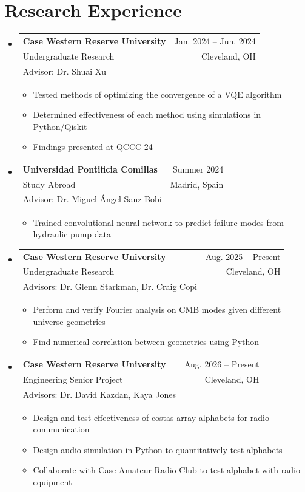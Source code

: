\documentclass[letterpaper,11pt]{article}
\makeatletter
\newcommand{\resumeItem}[1]{
  \item\small{
    {#1 \vspace{-2pt}}
  }
}
\newcommand{\resumeResearchSubheading}[5]{
  \item
    \begin{tabular*}{0.97\textwidth}[t]{l@{\extracolsep{\fill}}r}
      \textbf{#1} & #2 \\
      {#3} & {#4} \\
      \small #5 & \\
    \end{tabular*}\vspace{-7pt}
}
\newcommand{\resumeSubHeadingListStart}{\begin{itemize}[leftmargin=0.15in, label={}]}
\newcommand{\resumeSubHeadingListEnd}{\end{itemize}}
\newcommand{\resumeItemListStart}{\begin{itemize}}
\newcommand{\resumeItemListEnd}{\end{itemize}\vspace{-5pt}}
\makeatother
\begin{document}
\section{Research Experience}
  \resumeSubHeadingListStart
    \resumeResearchSubheading
      {Case Western Reserve University}{Jan. 2024 -- Jun. 2024}
      {Undergraduate Research}{Cleveland, OH}
      {Advisor: Dr. Shuai Xu}
      \resumeItemListStart
        \resumeItem{Tested methods of optimizing the convergence of a VQE algorithm}
        \resumeItem{Determined effectiveness of each method using simulations in Python/Qiskit}
        \resumeItem{Findings presented at QCCC-24}
      \resumeItemListEnd
    \resumeResearchSubheading
      {Universidad Pontificia Comillas}{Summer 2024}
      {Study Abroad}{Madrid, Spain}
      {Advisor: Dr. Miguel Ángel Sanz Bobi}
      \resumeItemListStart
        \resumeItem{Trained convolutional neural network to predict failure modes from hydraulic pump data}
      \resumeItemListEnd
    \resumeResearchSubheading
      {Case Western Reserve University}{Aug. 2025 -- Present}
      {Undergraduate Research}{Cleveland, OH}
      {Advisors: Dr. Glenn Starkman, Dr. Craig Copi}
      \resumeItemListStart
        \resumeItem{Perform and verify Fourier analysis on CMB modes given different universe geometries}
        \resumeItem{Find numerical correlation between geometries using Python}
      \resumeItemListEnd
    \resumeResearchSubheading
      {Case Western Reserve University}{Aug. 2026 -- Present}
      {Engineering Senior Project}{Cleveland, OH}
      {Advisors: Dr. David Kazdan, Kaya Jones}
      \resumeItemListStart
        \resumeItem{Design and test effectiveness of costas array alphabets for radio communication}
        \resumeItem{Design audio simulation in Python to quantitatively test alphabets}
        \resumeItem{Collaborate with Case Amateur Radio Club to test alphabet with radio equipment}
      \resumeItemListEnd
  \resumeSubHeadingListEnd
\end{document}
